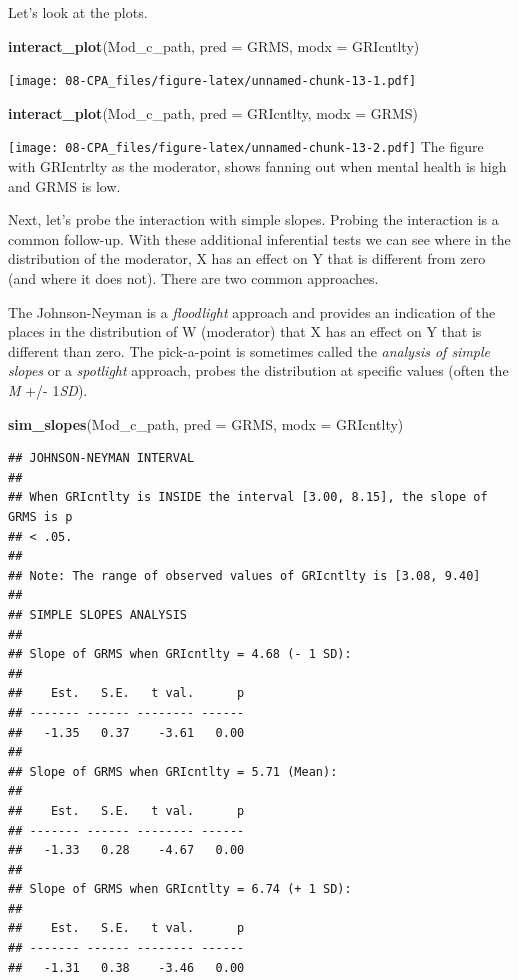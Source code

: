 \documentclass[
  11pt,
]{book}
\newenvironment{Shaded}{\begin{snugshade}}{\end{snugshade}}
\newcommand{\AttributeTok}[1]{\textcolor[rgb]{0.27,0.27,0.27}{#1}}
\newcommand{\FunctionTok}[1]{\textcolor[rgb]{0.27,0.27,0.27}{\textbf{#1}}}
\newcommand{\NormalTok}[1]{#1}
\begin{document}
Let's look at the plots.

\begin{Shaded}
\begin{Highlighting}[]
\FunctionTok{interact\_plot}\NormalTok{(Mod\_c\_path, }\AttributeTok{pred =}\NormalTok{ GRMS, }\AttributeTok{modx =}\NormalTok{ GRIcntlty)}
\end{Highlighting}
\end{Shaded}

\texttt{[image: 08-CPA\_files/figure-latex/unnamed-chunk-13-1.pdf]}

\begin{Shaded}
\begin{Highlighting}[]
\FunctionTok{interact\_plot}\NormalTok{(Mod\_c\_path, }\AttributeTok{pred =}\NormalTok{ GRIcntlty, }\AttributeTok{modx =}\NormalTok{ GRMS)}
\end{Highlighting}
\end{Shaded}

\texttt{[image: 08-CPA\_files/figure-latex/unnamed-chunk-13-2.pdf]} The figure with GRIcntrlty as the moderator, shows fanning out when mental health is high and GRMS is low.

Next, let's probe the interaction with simple slopes. Probing the interaction is a common follow-up. With these additional inferential tests we can see where in the distribution of the moderator, X has an effect on Y that is different from zero (and where it does not). There are two common approaches.

The Johnson-Neyman is a \emph{floodlight} approach and provides an indication of the places in the distribution of W (moderator) that X has an effect on Y that is different than zero. The pick-a-point is sometimes called the \emph{analysis of simple slopes} or a \emph{spotlight} approach, probes the distribution at specific values (often the \emph{M} +/- 1\emph{SD}).

\begin{Shaded}
\begin{Highlighting}[]
\FunctionTok{sim\_slopes}\NormalTok{(Mod\_c\_path, }\AttributeTok{pred =}\NormalTok{ GRMS, }\AttributeTok{modx =}\NormalTok{ GRIcntlty)}
\end{Highlighting}
\end{Shaded}

\begin{verbatim}
## JOHNSON-NEYMAN INTERVAL 
## 
## When GRIcntlty is INSIDE the interval [3.00, 8.15], the slope of GRMS is p
## < .05.
## 
## Note: The range of observed values of GRIcntlty is [3.08, 9.40]
## 
## SIMPLE SLOPES ANALYSIS 
## 
## Slope of GRMS when GRIcntlty = 4.68 (- 1 SD): 
## 
##    Est.   S.E.   t val.      p
## ------- ------ -------- ------
##   -1.35   0.37    -3.61   0.00
## 
## Slope of GRMS when GRIcntlty = 5.71 (Mean): 
## 
##    Est.   S.E.   t val.      p
## ------- ------ -------- ------
##   -1.33   0.28    -4.67   0.00
## 
## Slope of GRMS when GRIcntlty = 6.74 (+ 1 SD): 
## 
##    Est.   S.E.   t val.      p
## ------- ------ -------- ------
##   -1.31   0.38    -3.46   0.00
\end{verbatim}
\end{document}
